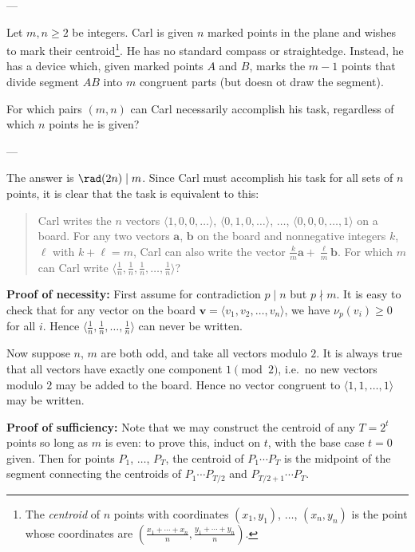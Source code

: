 
---

Let $m,n\ge2$ be integers. Carl is given $n$ marked points in the plane and wishes to mark their centroid\footnote{The \emph{centroid} of $n$ points with coordinates $(x_1,y_1)$, $\ldots$, $(x_n,y_n)$ is the point whose coordinates are $(\tfrac{x_1+\cdots+x_n}n,\tfrac{y_1+\cdots+y_n}n)$.}. He has no standard compass or straightedge. Instead, he has a device which, given marked points $A$ and $B$, marks the $m-1$ points that divide segment $AB$ into $m$ congruent parts (but doesn ot draw the segment).

For which pairs $(m,n)$ can Carl necessarily accomplish his task, regardless of which $n$ points he is given?

---

The answer is $\rad(2n)\mid m$. Since Carl must accomplish his task for all sets of $n$ points, it is clear that the task is equivalent to this:
\begin{quote}
    Carl writes the $n$ vectors $\langle1,0,0,\ldots\rangle$, $\langle0,1,0,\ldots\rangle$, $\ldots$, $\langle0,0,0,\ldots,1\rangle$ on a board. For any two vectors $\mathbf a$, $\mathbf b$ on the board and nonnegative integers $k$, $\ell$ with $k+\ell=m$, Carl can also write the vector $\tfrac km\mathbf a+\tfrac\ell m\mathbf b$. For which $m$ can Carl write $\langle\tfrac1n,\tfrac1n,\tfrac1n,\ldots,\tfrac1n\rangle$?
\end{quote}

\bigskip

\textbf{Proof of necessity:} First assume for contradiction $p\mid n$ but $p\nmid m$. It is easy to check that for any vector on the board $\mathbf v=\langle v_1,v_2,\ldots,v_n\rangle$, we have $\nu_p(v_i)\ge0$ for all $i$. Hence $\langle\tfrac1n,\tfrac1n,\ldots,\tfrac1n\rangle$ can never be written.

Now suppose $n$, $m$ are both odd, and take all vectors modulo $2$. It is always true that all vectors have exactly one component $1\pmod2$, i.e.\ no new vectors modulo $2$ may be added to the board. Hence no vector congruent to $\langle1,1,\ldots,1\rangle$ may be written.

\bigskip

\textbf{Proof of sufficiency:} Note that we may construct the centroid of any $T=2^t$ points so long as $m$ is even: to prove this, induct on $t$, with the base case $t=0$ given. Then for points $P_1$, $\ldots$, $P_T$, the centroid of $P_1\cdots P_T$ is the midpoint of the segment connecting the centroids of $P_1\cdots P_{T/2}$ and $P_{T/2+1}\cdots P_T$.

